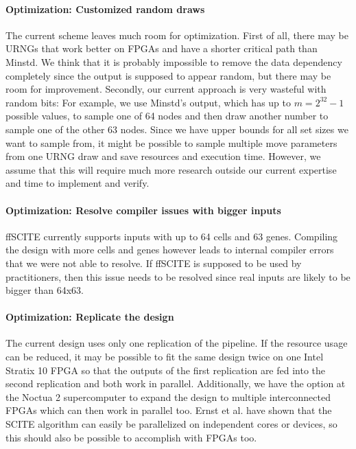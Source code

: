 \paragraph{Optimization: Customized random draws}
The current scheme leaves much room for optimization. First of all, there may be \acp{URNG} that work better on \acp{FPGA} and have a shorter critical path than Minstd. We think that it is probably impossible to remove the data dependency completely since the output is supposed to appear random, but there may be room for improvement. Secondly, our current approach is very wasteful with random bits: For example, we use Minstd's output, which has up to $m = 2^{32} - 1$ possible values, to sample one of 64 nodes and then draw another number to sample one of the other 63 nodes. Since we have upper bounds for all set sizes we want to sample from, it might be possible to sample multiple move parameters from one \ac{URNG} draw and save resources and execution time. However, we assume that this will require much more research outside our current expertise and time to implement and verify.

\paragraph{Optimization: Resolve compiler issues with bigger inputs}
\ac{ffSCITE} currently supports inputs with up to 64 cells and 63 genes. Compiling the design with more cells and genes however leads to internal compiler errors that we were not able to resolve. If \ac{ffSCITE} is supposed to be used by practitioners, then this issue needs to be resolved since real inputs are likely to be bigger than 64x63.

\paragraph{Optimization: Replicate the design}
The current design uses only one replication of the pipeline. If the resource usage can be reduced, it may be possible to fit the same design twice on one Intel Stratix 10 \ac{FPGA} so that the outputs of the first replication are fed into the second replication and both work in parallel. Additionally, we have the option at the Noctua 2 supercomputer to expand the design to multiple interconnected \acp{FPGA} which can then work in parallel too. Ernst et al. \cite{ernst2020Performance} have shown that the \ac{SCITE} algorithm can easily be parallelized on independent cores or devices, so this should also be possible to accomplish with \acp{FPGA} too.

